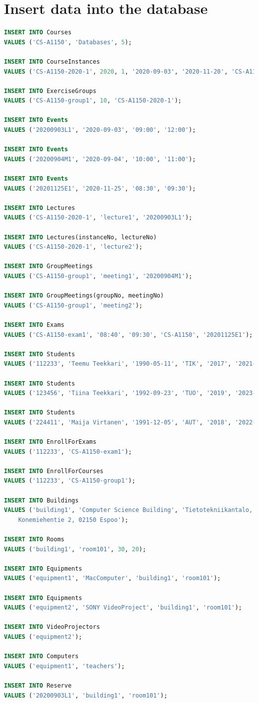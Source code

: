 \documentclass{article}
\begin{document}
\section{Insert data into the database}
\begin{lstlisting}[language=SQL]
INSERT INTO Courses
VALUES ('CS-A1150', 'Databases', 5);

INSERT INTO CourseInstances
VALUES ('CS-A1150-2020-1', 2020, 1, '2020-09-03', '2020-11-20', 'CS-A1150');

INSERT INTO ExerciseGroups
VALUES ('CS-A1150-group1', 10, 'CS-A1150-2020-1');

INSERT INTO Events
VALUES ('20200903L1', '2020-09-03', '09:00', '12:00');

INSERT INTO Events
VALUES ('20200904M1', '2020-09-04', '10:00', '11:00');

INSERT INTO Events
VALUES ('20201125E1', '2020-11-25', '08:30', '09:30');

INSERT INTO Lectures
VALUES ('CS-A1150-2020-1', 'lecture1', '20200903L1');

INSERT INTO Lectures(instanceNo, lectureNo)
VALUES ('CS-A1150-2020-1', 'lecture2');

INSERT INTO GroupMeetings
VALUES ('CS-A1150-group1', 'meeting1', '20200904M1');

INSERT INTO GroupMeetings(groupNo, meetingNo)
VALUES ('CS-A1150-group1', 'meeting2');

INSERT INTO Exams
VALUES ('CS-A1150-exam1', '08:40', '09:30', 'CS-A1150', '20201125E1');

INSERT INTO Students
VALUES ('112233', 'Teemu Teekkari', '1990-05-11', 'TIK', '2017', '2021-08-30');

INSERT INTO Students
VALUES ('123456', 'Tiina Teekkari', '1992-09-23', 'TUO', '2019', '2023-08-30');

INSERT INTO Students
VALUES ('224411', 'Maija Virtanen', '1991-12-05', 'AUT', '2018', '2022-08-30');

INSERT INTO EnrollForExams
VALUES ('112233', 'CS-A1150-exam1');

INSERT INTO EnrollForCourses
VALUES ('112233', 'CS-A1150-group1');

INSERT INTO Buildings
VALUES ('building1', 'Computer Science Building', 'Tietotekniikantalo, 
	Konemiehentie 2, 02150 Espoo');

INSERT INTO Rooms
VALUES ('building1', 'room101', 30, 20);

INSERT INTO Equipments
VALUES ('equipment1', 'MacComputer', 'building1', 'room101');

INSERT INTO Equipments
VALUES ('equipment2', 'SONY VideoProject', 'building1', 'room101');

INSERT INTO VideoProjectors
VALUES ('equipment2');

INSERT INTO Computers
VALUES ('equipment1', 'teachers');

INSERT INTO Reserve
VALUES ('20200903L1', 'building1', 'room101');
\end{lstlisting}
\end{document}
